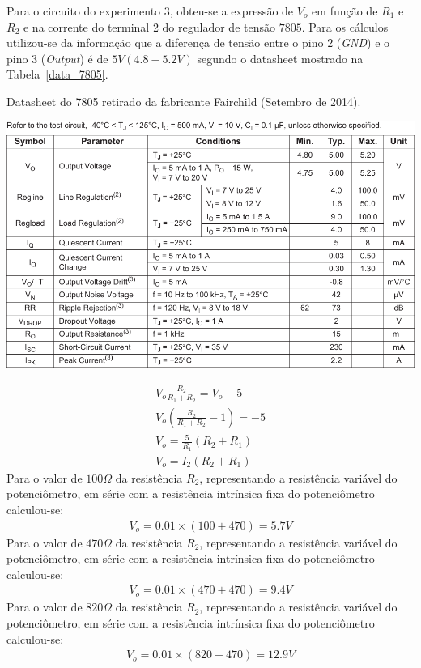 \documentclass[12pt,a4paper]{article}
\begin{document}
Para o circuito do experimento 3, obteu-se a expressão de $V_o$ em função de $R_1$ e $R_2$ e na corrente do terminal 2 do regulador de tensão $7805$. Para os cálculos utilizou-se da informação que a diferença de tensão entre o pino 2 (\emph{GND}) e o pino 3 (\emph{Output}) é de $5V (4.8-5.2V)$ segundo o datasheet mostrado na Tabela~\ref{data_7805}. 
\begin{table}[htpb]
  \centering
  \caption{Datasheet do 7805 retirado da fabricante Fairchild (Setembro de 2014).}
  \label{data_7805}
  \includegraphics[width=\linewidth]{7805.pdf}
\end{table}

\begin{align}
  V_o \frac{R_2 }{R_1+R_2} = V_o -5 \\ \nonumber
  V_o \left(\frac{R_2 }{R_1+R_2} -1 \right) =-5 \\\nonumber
  V_o= \frac{5}{R_1} \left(R_2 +R_1\right)\\\nonumber
  V_o= I_2 \left(R_2 +R_1\right)\nonumber
\end{align}
Para o valor de $100\Omega$  da resistência $R_2$, representando a resistência variável do potenciômetro, em série com a resistência intrínsica fixa do potenciômetro calculou-se:
\begin{align*}
  V_o = 0.01 \times \left( 100+470 \right)= 5.7 V
\end{align*}
Para o valor de $470\Omega$  da resistência $R_2$, representando a resistência variável do potenciômetro, em série com a resistência intrínsica fixa do potenciômetro calculou-se:
\begin{align*}
  V_o = 0.01 \times \left( 470+470 \right)= 9.4 V
\end{align*}
Para o valor de $820\Omega$  da resistência $R_2$, representando a resistência variável do potenciômetro, em série com a resistência intrínsica fixa do potenciômetro calculou-se:
\begin{align*}
  V_o = 0.01 \times \left( 820+470 \right)= 12.9 V
\end{align*}
\end{document}
